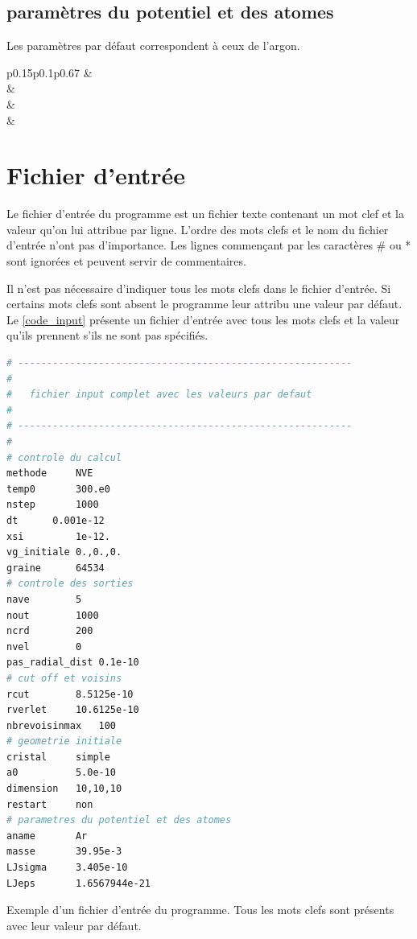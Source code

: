 \documentclass[11pt,a4paper,fleqn]{book}
\begin{document}
\subsection{paramètres du potentiel et des atomes}

Les paramètres par défaut correspondent à ceux de l'argon.

\begin{supertabular}{p{0.15\textwidth}p{0.1\textwidth}p{0.67\textwidth}}
	 &  \\

	 &  \\

	 &  \\
	
	 &  \\
\end{supertabular}

\section{Fichier d'entrée}

Le fichier d'entrée du programme est un fichier texte contenant un
mot clef et la valeur qu'on lui attribue par ligne. L'ordre des mots
clefs et le nom du fichier d'entrée n'ont pas d'importance. Les 
lignes commençant par les caractères \# ou * sont ignorées et peuvent servir
de commentaires. 

Il n'est pas nécessaire d'indiquer tous les mots clefs dans le fichier
d'entrée. Si certains mots clefs sont absent le programme leur attribu
une valeur par défaut. Le \ref{code_input} présente
un fichier d'entrée avec tous les mots clefs et la valeur qu'ils
prennent s'ils ne sont pas spécifiés.

\begin{codesource}[htbp]
\begin{lstlisting}[language=bash]
# ----------------------------------------------------------
#
#   fichier input complet avec les valeurs par defaut
#
# ----------------------------------------------------------
#
# controle du calcul
methode		NVE
temp0	 	300.e0
nstep		1000
dt		0.001e-12
xsi 		1e-12.
vg_initiale	0.,0.,0.
graine		64534
# controle des sorties
nave		5
nout		1000
ncrd		200
nvel		0
pas_radial_dist	0.1e-10
# cut off et voisins
rcut		8.5125e-10
rverlet		10.6125e-10
nbrevoisinmax	100
# geometrie initiale 
cristal		simple
a0			5.0e-10
dimension	10,10,10
restart		non
# parametres du potentiel et des atomes
aname		Ar
masse		39.95e-3
LJsigma		3.405e-10
LJeps		1.6567944e-21
\end{lstlisting}
\caption{Exemple d'un fichier d'entrée du programme. Tous les mots
clefs sont présents avec leur valeur par défaut.}
\label{code_input}
\end{codesource}
\end{document}
